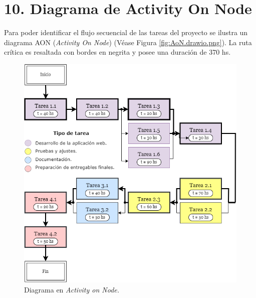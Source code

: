 \documentclass[
11pt, %
codirector, %
]{charter}
\begin{document}
\section{10. Diagrama de Activity On Node}
\label{sec:AoN}
Para poder identificar el flujo secuencial de las tareas del proyecto se ilustra un diagrama AON (\textit{Activity On Node}) (Véase Figura \ref{fig:AoN.drawio.png}). La ruta crítica es resaltada con bordes en negrita y posee una duración de 370 hs.

\begin{figure}[htpb]
\centering 
\includegraphics[width=.9\textwidth]{./Figuras/AON.drawio.png}
\caption{Diagrama en \textit{Activity on Node.}}
\label{fig:AoN}
\end{figure}
\end{document}

